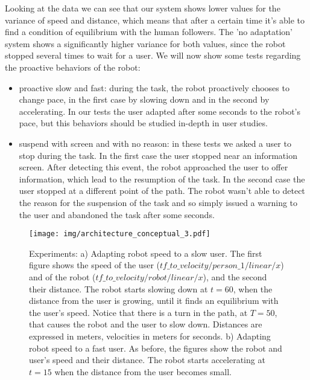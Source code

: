 Looking at the data we can see that our system shows lower values for the variance of speed and distance, which means that after a certain time it's able to find a condition of equilibrium with the human followers. The 'no adaptation' system shows a significantly higher variance for both values, since the robot stopped several times to wait for a user. We will now show some tests regarding the proactive behaviors of the robot:

\begin{itemize}
\item proactive slow and fast: during the task, the robot proactively chooses to change pace, in the first case by slowing down and in the second by accelerating. In our tests the user adapted after some seconds to the robot's pace, but this behaviors should be studied in-depth in user studies.
\item suspend with screen and with no reason: in these tests we asked a user to stop during the task. In the first case the user stopped near an information screen. After detecting this event, the robot approached the user to offer information, which lead to the resumption of the task. In the second case the user stopped at a different point of the path. The robot wasn't able to detect the reason for the suspension of the task and so simply   issued a warning to the user and abandoned the task after some seconds.
\end{itemize}


\begin{figure}[h!]
\caption{Experiments: a) Adapting robot speed to a slow user. The first figure shows the speed of the user ($tf\_to\_velocity/person\_1/linear/x$) and of the robot ($tf\_to\_velocity/robot/linear/x$), and the second their distance. The robot starts slowing down at $t=60$, when the distance from the user is growing, until it finds an equilibrium with the user's speed. Notice that there is a turn in the path, at $T=50$, that causes the robot and the user to slow down. Distances are expressed in meters, velocities in meters for seconds.
b) Adapting robot speed to a fast user. As before, the figures show the robot and user's speed and their distance. The robot starts accelerating at $t=15$  when the distance from the user becomes small.}
\label{Fig:experiments}

  \centering
 \texttt{[image: img/architecture\_conceptual\_3.pdf]}

\end{figure}

